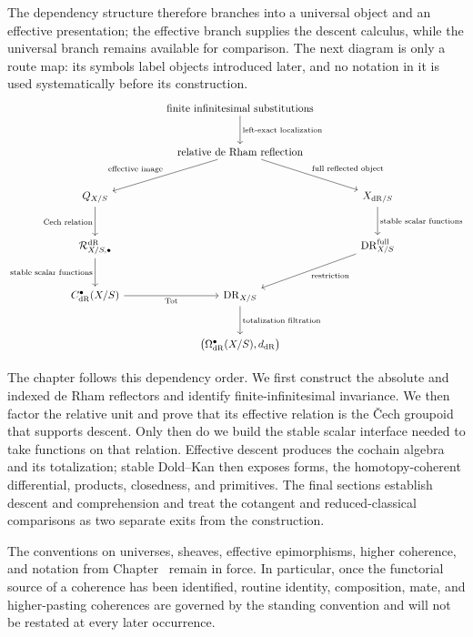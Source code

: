 The dependency structure therefore branches into a universal object and an
effective presentation; the effective branch supplies the descent calculus,
while the universal branch remains available for comparison. The next diagram is only a route map: its
symbols label objects introduced later, and no notation in it is used
systematically before its construction.
\[
\begin{tikzcd}[column sep=large,row sep=large]
  & \text{finite infinitesimal substitutions}
      \arrow[d,"\text{left-exact localization}"]
  &
  \\
  & \text{relative de Rham reflection}
      \arrow[dl,"\text{effective image}"']
      \arrow[dr,"\text{full reflected object}"]
  &
  \\
  Q_{X/S}
      \arrow[d,"\text{\v{C}ech relation}"']
  &&
  X_{\mathrm{dR}/S}
      \arrow[d,"\text{stable scalar functions}"]
  \\
  \mathcal R^{\mathrm{dR}}_{X/S,\bullet}
      \arrow[d,"\text{stable scalar functions}"']
  &&
  \mathrm{DR}^{\mathrm{full}}_{X/S}
      \arrow[dl,"\text{restriction}"]
  \\
  C^\bullet_{\mathrm{dR}}(X/S)
      \arrow[r,"\operatorname*{Tot}"']
  &
  \mathrm{DR}_{X/S}
      \arrow[d,"\text{totalization filtration}"]
  &
  \\
  & \bigl(\Omega^\bullet_{\mathrm{dR}}(X/S),d_{\mathrm{dR}}\bigr)
  &
\end{tikzcd}
\]

The chapter follows this dependency order. We first construct the absolute
and indexed de Rham reflectors and identify finite-infinitesimal invariance.
We then factor the relative unit and prove that its effective relation is the
\v{C}ech groupoid that supports descent. Only then do we build the stable
scalar interface needed to take functions on that relation. Effective descent
produces the cochain algebra and its totalization; stable Dold--Kan then exposes
forms, the homotopy-coherent differential, products, closedness, and primitives.
The final sections establish descent and comprehension and treat the cotangent
and reduced-classical comparisons as two separate exits from the construction.

The conventions on universes, sheaves, effective epimorphisms, higher
coherence, and notation from Chapter~
remain in force. In particular, once the functorial source of a coherence has
been identified, routine identity, composition, mate, and higher-pasting
coherences are governed by the standing convention and will not be restated at
every later occurrence.
